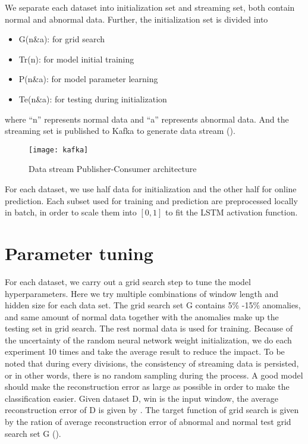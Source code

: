 We separate each dataset into initialization set and streaming set, both contain normal and abnormal data. Further, the initialization set is divided into 
\begin{itemize}
\item G(n\&a): for grid search
\item Tr(n): for model initial training
\item P(n\&a): for model parameter learning
\item Te(n\&a): for testing during initialization
\end{itemize}
where “n” represents normal data and “a” represents abnormal data. And the streaming set is published to Kafka to generate data stream ().

\begin{figure}[h]
\centering
\texttt{[image: kafka]}
\caption[Data stream Publisher-Consumer architecture]{Data stream Publisher-Consumer architecture}
\label{fig:kafka}
\end{figure}

For each dataset, we use half data for initialization and the other half for online prediction. Each subset used for training and prediction are preprocessed locally in batch, in order to scale them into $[0,1]$ to fit the LSTM activation function.


\section{Parameter tuning}
\label{sec:parametertuning}

For each dataset, we carry out a grid search step to tune the model hyperparameters. Here we try multiple combinations of window length and hidden size for each data set. The grid search set G contains 5\% -15\% anomalies, and same amount of normal data together with the anomalies make up the testing set in grid search. The rest normal data is used for training. Because of the uncertainty of the random neural network weight initialization, we do each experiment 10 times and take the average result to reduce the impact. To be noted that during every divisions, the consistency of streaming data is persisted, or in other words, there is no random sampling during the process. A good model should make the reconstruction error as large as possible in order to make the classification easier. Given dataset D,  win is the input window, the average reconstruction error of D is given by . The target function of grid search is given by the ration of average reconstruction error of abnormal and normal test grid search set G ().

